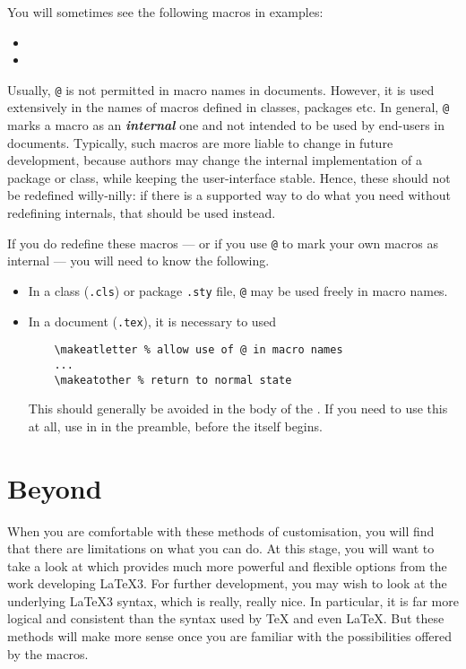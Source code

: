 
You will sometimes see the following macros in examples:
\begin{itemize}
  \item {}
  \item {}
\end{itemize}
Usually, \verb|@| is not permitted in macro names in documents.
However, it is used extensively in the names of macros defined in classes, packages etc\@.
In general, \verb|@| marks a macro as an \emph{\bfseries internal} one and not intended to be used by end-users in documents.
Typically, such macros are more liable to change in future development, because authors may change the internal implementation of a package or class, while keeping the user-interface stable.
Hence, these should not be redefined willy-nilly: if there is a supported way to do what you need without redefining internals, that should be used instead.

If you do redefine these macros --- or if you use \verb|@| to mark your own macros as internal --- you will need to know the following.
\begin{itemize}
  \item In a class (\verb|.cls|) or package {\verb|.sty|} file, \verb|@| may be used freely in macro names.
  \item In a document (\verb|.tex|), it is necessary to used
  \begin{verbatim}
    \makeatletter % allow use of @ in macro names
    ...
    \makeatother % return to normal state
  \end{verbatim}
  This should generally be avoided in the body of the .
  If you need to use this at all, use in in the preamble, before the  itself begins.
\end{itemize}



\section<1-| beamer:0>{Beyond \LaTeXe}\label{sec:beyond2e}


When you are comfortable with these methods of customisation, you will find that there are limitations on what you can do.
At this stage, you will want to take a look at  which provides much more powerful and flexible options from the work developing \LaTeX 3.
For further development, you may wish to look at the underlying \LaTeX 3 syntax, which is really, really nice.
In particular, it is far more logical and consistent than the syntax used by \TeX{} and even \LaTeX{}.
But these methods will make more sense once you are familiar with the possibilities offered by the \LaTeXe{} macros.

